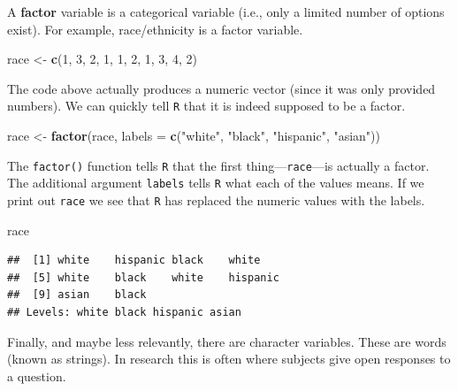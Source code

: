 \documentclass[]{tufte-book}
\newenvironment{Shaded}{}{}
\newcommand{\KeywordTok}[1]{\textcolor[rgb]{0.00,0.44,0.13}{\textbf{#1}}}
\newcommand{\DataTypeTok}[1]{\textcolor[rgb]{0.56,0.13,0.00}{#1}}
\newcommand{\DecValTok}[1]{\textcolor[rgb]{0.25,0.63,0.44}{#1}}
\newcommand{\StringTok}[1]{\textcolor[rgb]{0.25,0.44,0.63}{#1}}
\newcommand{\NormalTok}[1]{#1}
\theoremstyle{definition}
\theoremstyle{definition}
\theoremstyle{remark}
\begin{document}
A \textbf{factor} variable is a categorical variable (i.e., only a
limited number of options exist). For example, race/ethnicity is a
factor variable.

\begin{Shaded}
\begin{Highlighting}[]
\NormalTok{race <-}\StringTok{ }\KeywordTok{c}\NormalTok{(}\DecValTok{1}\NormalTok{, }\DecValTok{3}\NormalTok{, }\DecValTok{2}\NormalTok{, }\DecValTok{1}\NormalTok{, }\DecValTok{1}\NormalTok{, }\DecValTok{2}\NormalTok{, }\DecValTok{1}\NormalTok{, }\DecValTok{3}\NormalTok{, }\DecValTok{4}\NormalTok{, }\DecValTok{2}\NormalTok{)}
\end{Highlighting}
\end{Shaded}

The code above actually produces a numeric vector (since it was only
provided numbers). We can quickly tell \texttt{R} that it is indeed
supposed to be a factor.

\begin{Shaded}
\begin{Highlighting}[]
\NormalTok{race <-}\StringTok{ }\KeywordTok{factor}\NormalTok{(race, }\DataTypeTok{labels =} \KeywordTok{c}\NormalTok{(}\StringTok{"white"}\NormalTok{, }\StringTok{"black"}\NormalTok{, }
    \StringTok{"hispanic"}\NormalTok{, }\StringTok{"asian"}\NormalTok{))}
\end{Highlighting}
\end{Shaded}

The \texttt{factor()} function tells \texttt{R} that the first
thing---\texttt{race}---is actually a factor. The additional argument
\texttt{labels} tells \texttt{R} what each of the values means. If we
print out \texttt{race} we see that \texttt{R} has replaced the numeric
values with the labels.

\begin{Shaded}
\begin{Highlighting}[]
\NormalTok{race}
\end{Highlighting}
\end{Shaded}

\begin{verbatim}
##  [1] white    hispanic black    white   
##  [5] white    black    white    hispanic
##  [9] asian    black   
## Levels: white black hispanic asian
\end{verbatim}

Finally, and maybe less relevantly, there are character variables. These
are words (known as strings). In research this is often where subjects
give open responses to a question.
\end{document}
